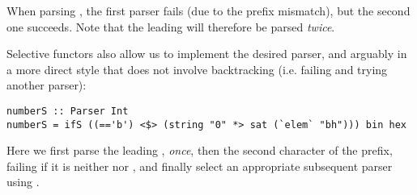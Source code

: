 \noindent
When parsing , the first parser fails (due to the prefix mismatch),
but the second one succeeds. Note that the leading  will therefore be
parsed \emph{twice}.

Selective functors also allow us to implement the desired parser, and arguably
in a more direct style that does not involve backtracking (i.e. failing and
trying another parser):

\vspace{1mm}
\begin{verbatim}
numberS :: Parser Int
numberS = ifS ((=='b') <$> (string "0" *> sat (`elem` "bh"))) bin hex
\end{verbatim}
\vspace{1mm}

\noindent
Here we first parse the leading , \emph{once}, then the second character
of the prefix, failing if it is neither  nor , and finally
select an appropriate subsequent parser using .

